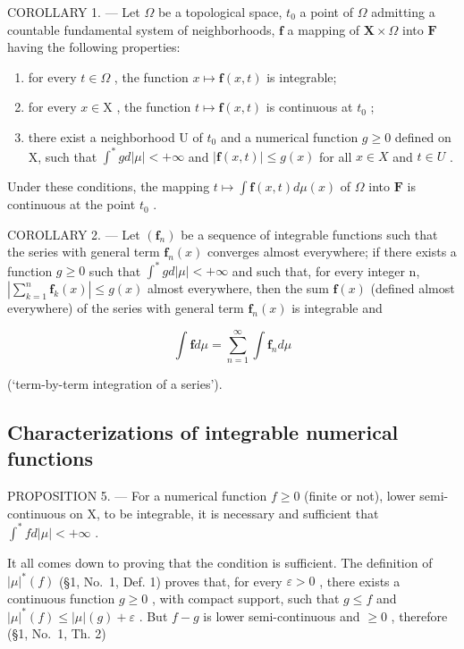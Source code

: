 COROLLARY 1. --- Let \(\Omega\) be a topological space, \(t_0\) a point of \(\Omega\) admitting a countable fundamental system of neighborhoods, \(\mathbf{f}\) a mapping of \(\mathbf{X} \times \Omega\) into \(\mathbf{F}\) having the following properties:

\begin{enumerate}
\def\labelenumi{\alph{enumi})}
\item
  for every \(t \in \Omega\) , the function \(x \mapsto \mathbf{f}(x, t)\) is integrable;
\item
  for every \(x \in \mathrm{X}\) , the function \(t \mapsto \mathbf{f}(x, t)\) is continuous at \(t_0\) ;
\item
  there exist a neighborhood U of \(t_0\) and a numerical function \(g \geqslant 0\) defined on X, such that \(\int^{*} g d|\mu| < +\infty\) and \(|\mathbf{f}(x,t)| \leqslant g(x)\) for all \(x \in X\) and \(t \in U\) .
\end{enumerate}

Under these conditions, the mapping \(t \mapsto \int \mathbf{f}(x,t) d\mu(x)\) of \(\Omega\) into \(\mathbf{F}\) is continuous at the point \(t_0\) .

COROLLARY 2. --- Let \((\mathbf{f}_{n})\) be a sequence of integrable functions such that the series with general term \(\mathbf{f}_{n}(x)\) converges almost everywhere; if there exists a function \(g \geqslant 0\) such that \(\int^{*} g d|\mu| < +\infty\) and such that, for every integer n, \(\left|\sum_{k=1}^{n} \mathbf{f}_{k}(x)\right| \leqslant g(x)\) almost everywhere, then the sum \(\mathbf{f}(x)\) (defined almost everywhere) of the series with general term \(\mathbf{f}_{n}(x)\) is integrable and

\[
\int \mathbf {f} d \mu = \sum_ {n = 1} ^ {\infty} \int \mathbf {f} _ {n} d \mu\tag{12}
\]

(`term-by-term integration of a series').

\subsection{Characterizations of integrable numerical functions}

PROPOSITION 5. --- For a numerical function \(f \geqslant 0\) (finite or not), lower semi-continuous on X, to be integrable, it is necessary and sufficient that \(\int^{*} f d|\mu| < +\infty\) .

It all comes down to proving that the condition is sufficient. The definition of \(|\mu|^*(f)\) (§1, No.~1, Def. 1) proves that, for every \(\varepsilon > 0\) , there exists a continuous function \(g \geqslant 0\) , with compact support, such that \(g \leqslant f\) and \(|\mu|^*(f) \leqslant |\mu|(g) + \varepsilon\) . But \(f - g\) is lower semi-continuous and \(\geqslant 0\) , therefore (§1, No.~1, Th. 2)

